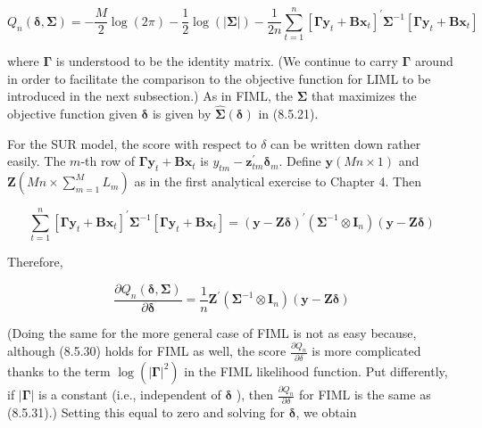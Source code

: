 \documentclass[10pt]{article}
\begin{document}
\begin{equation*}
Q_{n}(\boldsymbol{\delta}, \mathbf{\Sigma})=-\frac{M}{2} \log (2 \pi)-\frac{1}{2} \log (|\mathbf{\Sigma}|)-\frac{1}{2 n} \sum_{t=1}^{n}\left[\mathbf{\Gamma} \mathbf{y}_{t}+\mathbf{B} \mathbf{x}_{t}\right]^{\prime} \mathbf{\Sigma}^{-1}\left[\mathbf{\Gamma} \mathbf{y}_{t}+\mathbf{B} \mathbf{x}_{t}\right] \tag{8.5.29}
\end{equation*}


where $\boldsymbol{\Gamma}$ is understood to be the identity matrix. (We continue to carry $\boldsymbol{\Gamma}$ around in order to facilitate the comparison to the objective function for LIML to be introduced in the next subsection.) As in FIML, the $\boldsymbol{\Sigma}$ that maximizes the objective function given $\boldsymbol{\delta}$ is given by $\widehat{\boldsymbol{\Sigma}}(\boldsymbol{\delta})$ in (8.5.21).

For the SUR model, the score with respect to $\delta$ can be written down rather easily. The $m$-th row of $\boldsymbol{\Gamma} \mathbf{y}_{t}+\mathbf{B} \mathbf{x}_{t}$ is $y_{t m}-\mathbf{z}_{t m}^{\prime} \boldsymbol{\delta}_{m}$. Define $\mathbf{y}(M n \times 1)$ and $\mathbf{Z} \left(M n \times \sum_{m=1}^{M} L_{m}\right)$ as in the first analytical exercise to Chapter 4. Then


\begin{equation*}
\sum_{t=1}^{n}\left[\boldsymbol{\Gamma} \mathbf{y}_{t}+\mathbf{B} \mathbf{x}_{t}\right]^{\prime} \mathbf{\Sigma}^{-1}\left[\boldsymbol{\Gamma} \mathbf{y}_{t}+\mathbf{B} \mathbf{x}_{t}\right]=(\mathbf{y}-\mathbf{Z} \boldsymbol{\delta})^{\prime}\left(\boldsymbol{\Sigma}^{-1} \otimes \mathbf{I}_{n}\right)(\mathbf{y}-\mathbf{Z} \boldsymbol{\delta}) \tag{8.5.30}
\end{equation*}


Therefore,


\begin{equation*}
\frac{\partial Q_{n}(\boldsymbol{\delta}, \mathbf{\Sigma})}{\partial \boldsymbol{\delta}}=\frac{1}{n} \mathbf{Z}^{\prime}\left(\mathbf{\Sigma}^{-1} \otimes \mathbf{I}_{n}\right)(\mathbf{y}-\mathbf{Z} \boldsymbol{\delta}) \tag{8.5.31}
\end{equation*}


(Doing the same for the more general case of FIML is not as easy because, although (8.5.30) holds for FIML as well, the score $\frac{\partial Q_{n}}{\partial \delta}$ is more complicated thanks to the term $\log \left(|\boldsymbol{\Gamma}|^{2}\right)$ in the FIML likelihood function. Put differently, if $|\boldsymbol{\Gamma}|$ is a constant (i.e., independent of $\boldsymbol{\delta}$ ), then $\frac{\partial Q_{n}}{\partial \delta}$ for FIML is the same as (8.5.31).) Setting this equal to zero and solving for $\boldsymbol{\delta}$, we obtain
\end{document}
